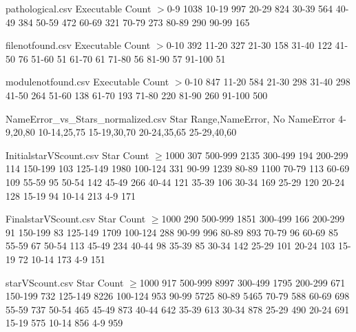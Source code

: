 
\begin{filecontents}{pathological.csv}
Executable	Count
$>$0-9	1038
10-19	997
20-29	824
30-39	564
40-49	384
50-59	472
60-69	321
70-79	273
80-89	290
90-99	165
\end{filecontents}

\begin{filecontents}{filenotfound.csv}
Executable	Count
$>$0-10	392
11-20	327
21-30	158
31-40	122
41-50	76
51-60	51
61-70	61
71-80	56
81-90	57
91-100	51
\end{filecontents}

\begin{filecontents}{modulenotfound.csv}
Executable	Count
$>$0-10	847
11-20	584
21-30	298
31-40	298
41-50	264
51-60	138
61-70	193
71-80	220
81-90	260
91-100	500
\end{filecontents}

\begin{filecontents}{NameError_vs_Stars_normalized.csv}
Star Range,NameError, No NameError
4-9,20,80
10-14,25,75
15-19,30,70
20-24,35,65
25-29,40,60
\end{filecontents}

\begin{filecontents}{InitialstarVScount.csv}
Star	Count
$\geq$1000	307
500-999	2135
300-499	194
200-299	114
150-199	103
125-149	1980
100-124	331
90-99	1239
80-89	1100
70-79	113
60-69	109
55-59	95
50-54	142
45-49	266
40-44	121
35-39	106
30-34	169
25-29	120
20-24	128
15-19	94
10-14	213
4-9	171
\end{filecontents}

\begin{filecontents}{FinalstarVScount.csv}
Star Count
$\geq$1000 290
500-999 1851
300-499 166
200-299 91
150-199 83
125-149 1709
100-124 288
90-99 996
80-89 893
70-79 96
60-69 85
55-59 67
50-54 113
45-49 234
40-44 98
35-39 85
30-34 142
25-29 101
20-24 103
15-19 72
10-14 173
4-9 151
\end{filecontents}

\begin{filecontents}{starVScount.csv}
Star	Count
$\geq$1000	917
500-999	8997
300-499	1795
200-299	671
150-199	732
125-149	8226
100-124	953
90-99	5725
80-89	5465
70-79	588
60-69	698
55-59	737
50-54	465
45-49	873
40-44	642
35-39	613
30-34	878
25-29	490
20-24	691
15-19	575
10-14	856
4-9	959

\end{filecontents}

